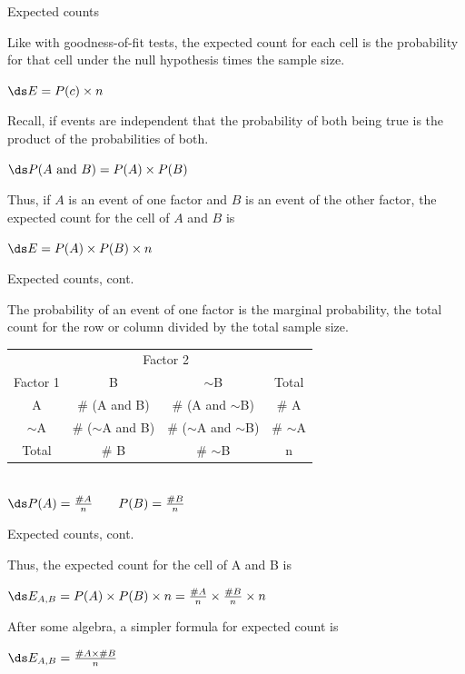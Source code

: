 \documentclass[xcolor=table, handout]{beamer}
\begin{document}
\begin{frame}{Expected counts}
\begin{block}{}
\large
Like with goodness-of-fit tests, the expected count for each cell is the probability for that cell under the null hypothesis times the sample size.\\
\medskip
{\centering
$\ds E = P(c) \times n$
\par}
\pause\medskip
Recall, if events are independent that the probability of both being true is the product of the probabilities of both.\\
\medskip
{\centering
$\ds P(A \text{ and } B) = P(A) \times P(B)$
\par}
\pause\medskip
Thus, if $A$ is an event of one factor and $B$ is an event of the other factor, the expected count for the cell of $A$ and $B$ is\\
\medskip
{\centering
$\ds E = P(A) \times P(B) \times n$
\par}
\medskip
\end{block}
\end{frame}

\begin{frame}{Expected counts, cont.}
\begin{block}{}
\large
The probability of an event of one factor is the marginal probability, the total count for the row or column divided by the total sample size.\\
\medskip
{\centering
\begin{tabular}{c | c  c | c}
\multicolumn{1}{c}{} & \multicolumn{2}{c}{Factor 2}\\
Factor 1 & B & $\sim$B & Total\\
\hline
A & \# (A and B) & \# (A and $\sim$B) & \# A\\
$\sim$A & \# ($\sim$A and B) & \# ($\sim$A and $\sim$B) & \# $\sim$A \\
\hline
Total & \# B & \# $\sim$B & n
\end{tabular}\\
\bigskip
$\ds P(A) = \frac {\# A}{n} \qquad P(B) = \frac {\# B} n$
\par}
\smallskip
\end{block}
\end{frame}

\begin{frame}{Expected counts, cont.}
\begin{block}{}
\large
Thus, the expected count for the cell of A and B is\\
\medskip
{\centering
$\ds E_{A,B} = P(A) \times P(B) \times n = \frac {\# A} n \times \frac {\# B} n \times n$
\par}
\pause\bigskip
After some algebra, a simpler formula for expected count is\\
\medskip
{\centering
$\ds E_{A,B}  = \frac{\# A \times \# B}{n}$
\par}
\medskip
\end{block}
\end{frame}
\end{document}
